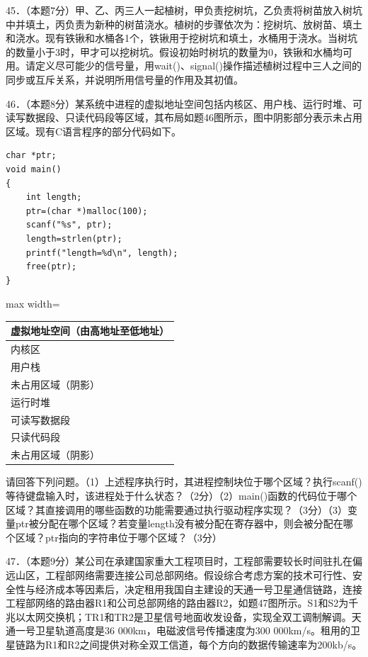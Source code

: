 \documentclass[UTF8,11pt]{ctexart}
\begin{document}
45．（本题7分）甲、乙、丙三人一起植树，甲负责挖树坑，乙负责将树苗放入树坑中并填土，丙负责为新种的树苗浇水。植树的步骤依次为：挖树坑、放树苗、填土和浇水。现有铁锹和水桶各1个，铁锹用于挖树坑和填土，水桶用于浇水。当树坑的数量小于3时，甲才可以挖树坑。假设初始时树坑的数量为0，铁锹和水桶均可用。请定义尽可能少的信号量，用wait()、signal()操作描述植树过程中三人之间的同步或互斥关系，并说明所用信号量的作用及其初值。


46．（本题8分）某系统中进程的虚拟地址空间包括内核区、用户栈、运行时堆、可读写数据段、只读代码段等区域，其布局如题46图所示，图中阴影部分表示未占用区域。现有C语言程序的部分代码如下。


\begin{Verbatim}[breaklines,breakanywhere,fontsize=\small]
char *ptr;
void main()
{
    int length;
    ptr=(char *)malloc(100);
    scanf("%s", ptr);
    length=strlen(ptr);
    printf("length=%d\n", length);
    free(ptr);
}
\end{Verbatim}

\begin{center}\begin{adjustbox}{max width=\linewidth}\begin{tabular}{|>{\raggedright\arraybackslash}p{\dimexpr(\linewidth-2\tabcolsep-2\arrayrulewidth)/1\relax}|}\hline
虚拟地址空间（由高地址至低地址）\\\hline
内核区\\\hline
用户栈\\\hline
未占用区域（阴影）\\\hline
运行时堆\\\hline
可读写数据段\\\hline
只读代码段\\\hline
未占用区域（阴影）\\\hline\end{tabular}\end{adjustbox}\end{center}

请回答下列问题。（1）上述程序执行时，其进程控制块位于哪个区域？执行scanf()等待键盘输入时，该进程处于什么状态？（2分）（2）main()函数的代码位于哪个区域？其直接调用的哪些函数的功能需要通过执行驱动程序实现？（3分）（3）变量ptr被分配在哪个区域？若变量length没有被分配在寄存器中，则会被分配在哪个区域？ptr指向的字符串位于哪个区域？（3分）


47．（本题9分）某公司在承建国家重大工程项目时，工程部需要较长时间驻扎在偏远山区，工程部网络需要连接公司总部网络。假设综合考虑方案的技术可行性、安全性与经济成本等因素后，决定租用我国自主建设的天通一号卫星通信链路，连接工程部网络的路由器R1和公司总部网络的路由器R2，如题47图所示。S1和S2为千兆以太网交换机；TR1和TR2是卫星信号地面收发设备，实现全双工调制解调。天通一号卫星轨道高度是36 000km，电磁波信号传播速度为300 000km/s。租用的卫星链路为R1和R2之间提供对称全双工信道，每个方向的数据传输速率为200kb/s。
\end{document}
